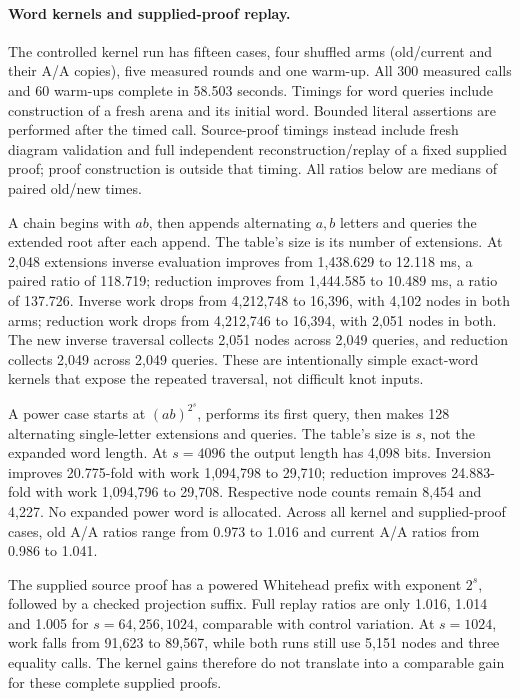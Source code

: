 \paragraph{Word kernels and supplied-proof replay.}
The controlled kernel run has fifteen cases, four shuffled arms (old/current
and their A/A copies), five measured rounds and one warm-up. All 300 measured
calls and 60 warm-ups complete in 58.503 seconds. Timings for word queries
include construction of a fresh arena and its initial word. Bounded literal
assertions are performed after the timed call. Source-proof timings instead
include fresh diagram validation and full independent reconstruction/replay
of a fixed supplied proof; proof construction is outside that timing.
All ratios below are medians of paired old/new times.



A chain begins with $ab$, then appends alternating $a,b$ letters and queries
the extended root after each append. The table's size is its number of
extensions. At 2,048 extensions inverse evaluation improves from
1,438.629 to 12.118 ms, a paired ratio of 118.719; reduction improves from
1,444.585 to 10.489 ms, a ratio of 137.726. Inverse work drops from
4,212,748 to 16,396, with 4,102 nodes in both arms; reduction work drops
from 4,212,746 to 16,394, with 2,051 nodes in both. The new inverse traversal
collects 2,051 nodes across 2,049 queries, and reduction collects 2,049 across
2,049 queries. These are intentionally simple exact-word kernels that expose
the repeated traversal, not difficult knot inputs.

A power case starts at $(ab)^{2^s}$, performs its first query, then makes
128 alternating single-letter extensions and queries. The table's size is
$s$, not the expanded word length. At $s=4096$ the output length has
4,098 bits. Inversion improves 20.775-fold with work 1,094,798 to 29,710;
reduction improves 24.883-fold with work 1,094,796 to 29,708. Respective
node counts remain 8,454 and 4,227. No expanded power word is allocated.
Across all kernel and supplied-proof cases, old A/A ratios range from
0.973 to 1.016 and current A/A ratios from 0.986 to 1.041.

The supplied source proof has a powered Whitehead prefix with exponent
$2^s$, followed by a checked projection suffix. Full replay ratios are only
1.016, 1.014 and 1.005 for $s=64,256,1024$, comparable with control variation.
At $s=1024$, work falls from 91,623 to 89,567, while both runs still use
5,151 nodes and three equality calls. The kernel gains therefore do not
translate into a comparable gain for these complete supplied proofs.



